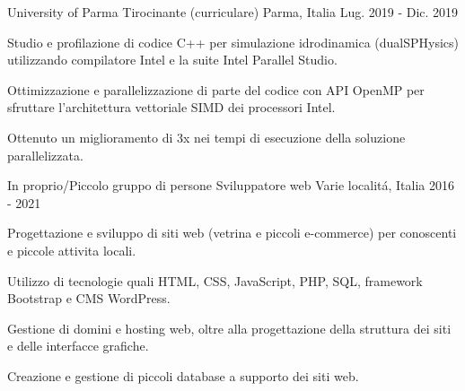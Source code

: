 \begin{cventries}
\cventry
    {University of Parma} %
    {Tirocinante (curriculare)} %
    {Parma, Italia} %
    {Lug. 2019 - Dic. 2019} %
    {
        \begin{cvitems} %
            \item {Studio e profilazione di codice C++ per simulazione idrodinamica (dualSPHysics)
            utilizzando compilatore Intel e la suite Intel Parallel Studio.}
            \item {Ottimizzazione e parallelizzazione di parte del codice con API OpenMP per sfruttare
            l'architettura vettoriale SIMD dei processori Intel.}
            \item {Ottenuto un miglioramento di 3x nei tempi di esecuzione della soluzione parallelizzata.}
        \end{cvitems}
    }

\cventry
    {In proprio/Piccolo gruppo di persone} %
    {Sviluppatore web} %
    {Varie localitá, Italia} %
    {2016 - 2021} %
    {
            \begin{cvitems} %
            \item {Progettazione e sviluppo di siti web (vetrina e piccoli e-commerce)
        per conoscenti e piccole attivita locali.}
        \item {Utilizzo di tecnologie quali HTML, CSS, JavaScript, PHP, SQL, framework Bootstrap
            e CMS WordPress.}
        \item {Gestione di domini e hosting web, oltre alla progettazione della struttura dei siti
        e delle interfacce grafiche.}
        \item {Creazione e gestione di piccoli database a supporto dei siti web.}
            \end{cvitems}
    }

\end{cventries}

